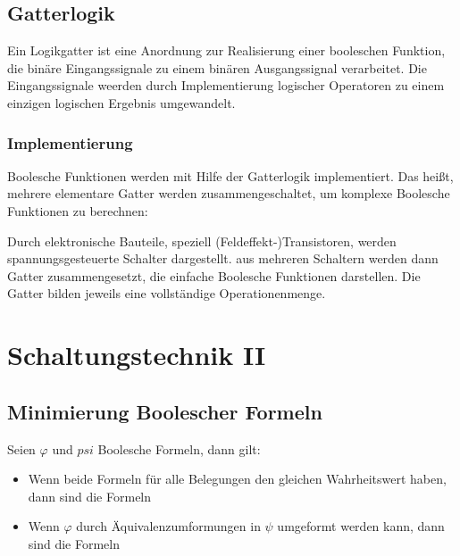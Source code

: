 \documentclass[12pt]{report}
\begin{document}
\section{Gatterlogik}
\begin{defbox}
  Ein Logikgatter ist eine Anordnung zur Realisierung einer booleschen Funktion, die binäre Eingangssignale zu einem binären Ausgangssignal verarbeitet.
  Die Eingangssignale weerden durch Implementierung logischer Operatoren zu einem einzigen logischen Ergebnis umgewandelt.
\end{defbox}

\subsection{Implementierung}
Boolesche Funktionen werden mit Hilfe der Gatterlogik implementiert. 
Das heißt, mehrere elementare Gatter werden zusammengeschaltet, um komplexe Boolesche Funktionen zu berechnen:

Durch elektronische Bauteile, speziell (Feldeffekt-)Transistoren, werden spannungsgesteuerte Schalter dargestellt.
aus mehreren Schaltern werden dann Gatter zusammengesetzt, die einfache Boolesche Funktionen darstellen.
Die Gatter bilden jeweils eine vollständige Operationenmenge.


\chapter{Schaltungstechnik II}
\section{Minimierung Boolescher Formeln}
\begin{defbox}
  Seien $\varphi$ und $psi$ Boolesche Formeln, dann gilt:
  
  \begin{itemize}
    \item Wenn beide Formeln für alle Belegungen den gleichen Wahrheitswert haben, dann sind die Formeln
          
          
          
    \item Wenn $\varphi$ durch Äquivalenzumformungen in $\psi$ umgeformt werden kann, dann sind die Formeln
          
  \end{itemize}
\end{defbox}
\end{document}
